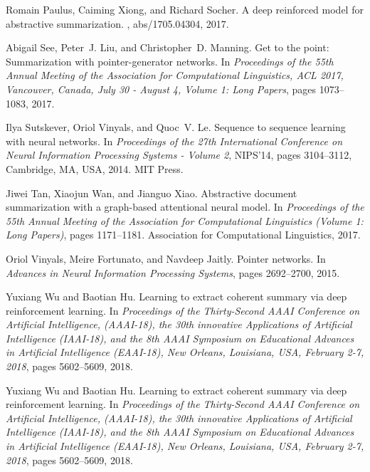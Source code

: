 \documentclass{article}
\begin{document}
\begin{thebibliography}{10}
Romain Paulus, Caiming Xiong, and Richard Socher.
\newblock A deep reinforced model for abstractive summarization.
, abs/1705.04304, 2017.

Abigail See, Peter~J. Liu, and Christopher~D. Manning.
\newblock Get to the point: Summarization with pointer-generator networks.
\newblock In {\em Proceedings of the 55th Annual Meeting of the Association for
  Computational Linguistics, {ACL} 2017, Vancouver, Canada, July 30 - August 4,
  Volume 1: Long Papers}, pages 1073--1083, 2017.

Ilya Sutskever, Oriol Vinyals, and Quoc~V. Le.
\newblock Sequence to sequence learning with neural networks.
\newblock In {\em Proceedings of the 27th International Conference on Neural
  Information Processing Systems - Volume 2}, NIPS'14, pages 3104--3112,
  Cambridge, MA, USA, 2014. MIT Press.

Jiwei Tan, Xiaojun Wan, and Jianguo Xiao.
\newblock Abstractive document summarization with a graph-based attentional
  neural model.
\newblock In {\em Proceedings of the 55th Annual Meeting of the Association for
  Computational Linguistics (Volume 1: Long Papers)}, pages 1171--1181.
  Association for Computational Linguistics, 2017.

Oriol Vinyals, Meire Fortunato, and Navdeep Jaitly.
\newblock Pointer networks.
\newblock In {\em Advances in Neural Information Processing Systems}, pages
  2692--2700, 2015.

Yuxiang Wu and Baotian Hu.
\newblock Learning to extract coherent summary via deep reinforcement learning.
\newblock In {\em Proceedings of the Thirty-Second {AAAI} Conference on
  Artificial Intelligence, (AAAI-18), the 30th innovative Applications of
  Artificial Intelligence (IAAI-18), and the 8th {AAAI} Symposium on
  Educational Advances in Artificial Intelligence (EAAI-18), New Orleans,
  Louisiana, USA, February 2-7, 2018}, pages 5602--5609, 2018.

Yuxiang Wu and Baotian Hu.
\newblock Learning to extract coherent summary via deep reinforcement learning.
\newblock In {\em Proceedings of the Thirty-Second {AAAI} Conference on
  Artificial Intelligence, (AAAI-18), the 30th innovative Applications of
  Artificial Intelligence (IAAI-18), and the 8th {AAAI} Symposium on
  Educational Advances in Artificial Intelligence (EAAI-18), New Orleans,
  Louisiana, USA, February 2-7, 2018}, pages 5602--5609, 2018.


\end{thebibliography}
\end{document}
